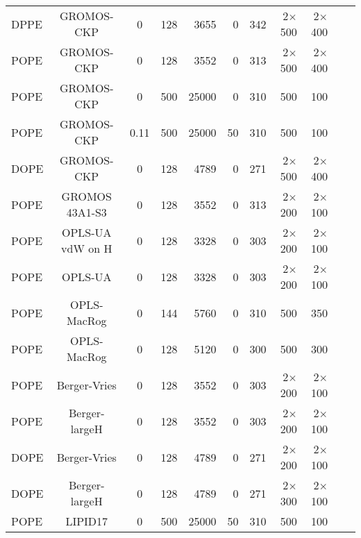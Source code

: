 \documentclass[journal=jpcbfk]{achemso}
\begin{document}
\begin{sidewaystable*}[!p]
\begin{minipage}[t]{\textwidth}
\begin{tabular}{l c c r r r r r r c c}
      \hline
      DPPE  & GROMOS-CKP    \cite{??}      &0    & 128	& 3655  &0    & 342  & 2$\times$500 & 2$\times$400 & \cite{gromosCKPdppe} \\
      POPE  & GROMOS-CKP    \cite{??}      &0    & 128	& 3552  &0    & 313  & 2$\times$500 & 2$\times$400 & \cite{gromosCKPpope} \\
      POPE  & GROMOS-CKP    \cite{??}      &0    & 500	& 25000 &0    & 310  & 500 & 100 & \cite{gromosCKPpopeT310} \\
      POPE  & GROMOS-CKP    \cite{??}      &0.11 & 500	& 25000 &50   & 310  & 500 & 100 & \cite{gromosCKPpopeT310150mMNaCl} \\
      DOPE  & GROMOS-CKP    \cite{??}      &0    & 128	& 4789  &0    & 271  & 2$\times$500 & 2$\times$400 & \cite{gromosCKPdope} \\
      \hline
      POPE  & GROMOS 43A1-S3 \cite{??}     &0    & 128	& 3552     &0    & 313  & 2$\times$200 & 2$\times$100 & \cite{gromos43a1s3POPEfiles}  \\
      \hline
      POPE  & OPLS-UA vdW on H \cite{??}   &0    & 128	& 3328     &0    & 303  & 2$\times$200 & 2$\times$100 & \cite{OPLSuaWvdWPOPEfiles} \\
      POPE  & OPLS-UA \cite{??}            &0    & 128	& 3328     &0    & 303  & 2$\times$200 & 2$\times$100 & \cite{OPLSuaPOPEfiles} \\
      \hline
      POPE  & OPLS-MacRog \cite{rog16}     &0    & 144	& 5760     &0    & 310  & 500 & 350 & \cite{MacRogPOPEfiles} \\
      POPE  & OPLS-MacRog \cite{rog16}     &0    & 128	& 5120     &0    & 300  & 500 & 300 & \cite{MacRogPOPEfilesT300K} \\
      \hline
      POPE  & Berger-Vries \cite{??}       &0    & 128	& 3552  &0    & 303  & 2$\times$200 & 2$\times$100 & \cite{bergerPOPEfiles}  \\
      POPE  & Berger-largeH \cite{??}      &0    & 128	& 3552  &0    & 303  & 2$\times$200 & 2$\times$100 & \cite{berger2POPEfiles}  \\
      DOPE  & Berger-Vries \cite{??}       &0    & 128	& 4789  &0    & 271  & 2$\times$200 & 2$\times$100 & \cite{bergerDOPEfiles}  \\
      DOPE  & Berger-largeH \cite{??}      &0    & 128	& 4789  &0    & 271  & 2$\times$300 & 2$\times$100 & \cite{berger2DOPEfiles} \\ 
      \hline
      POPE             & LIPID17 \cite{gould18} & 0      & 500 & 25000 & 50  &  310  & 500 & 100 & \cite{POPElipid17} \\

\end{tabular}
\end{minipage}
\end{sidewaystable*}
\end{document}
